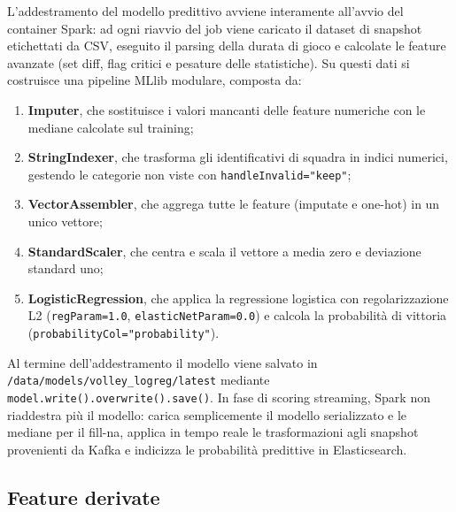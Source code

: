 \documentclass[a4paper,12pt]{report}
\begin{document}
L’addestramento del modello predittivo avviene interamente all’avvio del container Spark: ad ogni riavvio del job viene caricato il dataset di snapshot etichettati da CSV, eseguito il parsing della durata di gioco e calcolate le feature avanzate (set diff, flag critici e pesature delle statistiche). Su questi dati si costruisce una pipeline MLlib modulare, composta da:
\begin{enumerate}
  \item \textbf{Imputer}, che sostituisce i valori mancanti delle feature numeriche con le mediane calcolate sul training;
  \item \textbf{StringIndexer}, che trasforma gli identificativi di squadra in indici numerici, gestendo le categorie non viste con \texttt{handleInvalid="keep"};
  \item \textbf{VectorAssembler}, che aggrega tutte le feature (imputate e one-hot) in un unico vettore;
  \item \textbf{StandardScaler}, che centra e scala il vettore a media zero e deviazione standard uno;
  \item \textbf{LogisticRegression}, che applica la regressione logistica con regolarizzazione L2 (\texttt{regParam=1.0}, \texttt{elasticNetParam=0.0}) e calcola la probabilità di vittoria (\texttt{probabilityCol="probability"}).
\end{enumerate}
Al termine dell’addestramento il modello viene salvato in \texttt{/data/models/volley\_logreg/latest} mediante \texttt{model.write().overwrite().save()}. In fase di scoring streaming, Spark non riaddestra più il modello: carica semplicemente il modello serializzato e le mediane per il fill-na, applica in tempo reale le trasformazioni agli snapshot provenienti da Kafka e indicizza le probabilità predittive in Elasticsearch.


\subsection{Feature derivate}
\end{document}
